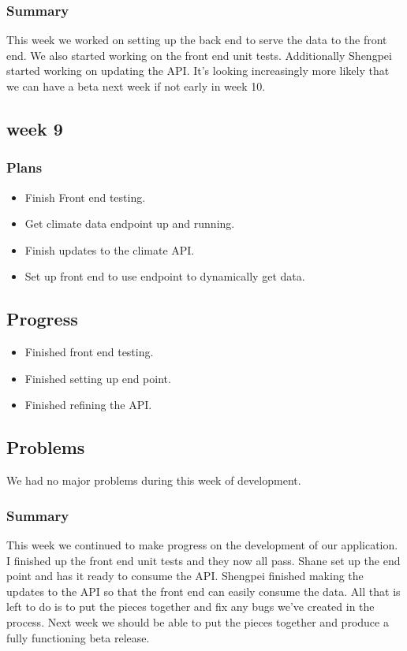 \documentclass[onecolumn, draftclsnofoot,10pt, compsoc]{article}
\begin{document}
			\subsubsection{Summary} This week we worked on setting up the back end to serve the data to the front end. We also started working on the front end unit tests. Additionally Shengpei started working on updating the API. It's looking increasingly more likely that we can have a beta next week if not early in week 10.\\
			
		\subsection{week 9}
			\subsubsection{Plans}
				\begin{itemize}
					\item Finish Front end testing.
					\item Get climate data endpoint up and running.
					\item Finish updates to the climate API.
					\item Set up front end to use endpoint to dynamically get data.
				\end{itemize}
			\subsection{Progress}
				\begin{itemize}
					\item Finished front end testing.
					\item Finished setting up end point.
					\item Finished refining the API.
				\end{itemize}
			\subsection{Problems}
				We had no major problems during this week of development.\\
			\subsubsection{Summary} This week we continued to make progress on the development of our application. I finished up the front end unit tests and they now all pass. Shane set up the end point and has it ready to consume the API. Shengpei finished making the updates to the API so that the front end can easily consume the data. All that is left to do is to put the pieces together and fix any bugs we've created in the process. Next week we should be able to put the pieces together and produce a fully functioning beta release.\\
\end{document}
